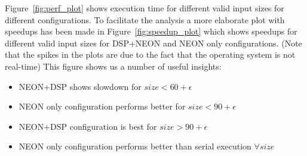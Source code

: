 Figure~\ref{fig:perf_plot} shows execution time for different valid input sizes for different configurations. To facilitate the analysis a more elaborate plot with speedups has been made in Figure~\ref{fig:speedup_plot} which shows speedups for different valid input sizes for DSP+NEON and NEON only configurations. (Note that the spikes in the plots are due to the fact that the operating system is not real-time) This figure shows us a number of useful insights:

\begin{itemize}
\item{NEON+DSP shows slowdown for $size < 60 + \epsilon$}
\item{NEON only configuration performs better for $size < 90 + \epsilon$}
\item{NEON+DSP configuration is best for $size >90 + \epsilon$}
\item{NEON only configuration performs better than serial execution $ \forall size$}

\end{itemize}